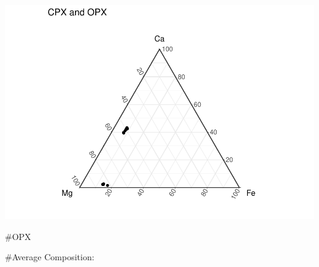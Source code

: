 \documentclass[
]{article}
\begin{document}
\includegraphics{KBH_94_23_DE_5_all_pyx_lines_files/figure-latex/unnamed-chunk-2-1.pdf}

\#OPX

\#Average Composition:
\end{document}
